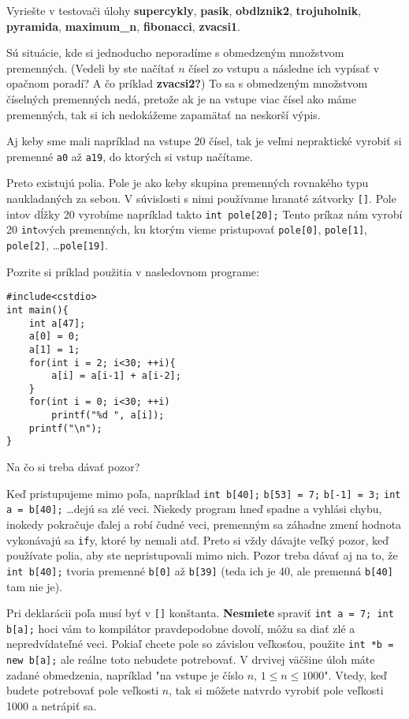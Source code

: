 Vyriešte v testovači úlohy \textbf{supercykly}, \textbf{pasik},
\textbf{obdlznik2}, \textbf{trojuholnik}, \textbf{pyramida}, 
\textbf{maximum\_n}, \textbf{fibonacci}, \textbf{zvacsi1}.


Sú situácie, kde si jednoducho neporadíme s obmedzeným množstvom premenných.
(Vedeli by ste načítať $n$ čísel zo vstupu a následne ich vypísať v opačnom
poradí? A čo príklad \textbf{zvacsi2?}) To sa s obmedzeným množstvom číselných
premenných nedá, pretože ak je na vstupe viac čísel ako máme premenných, tak si
ich nedokážeme zapamätať na neskorší výpis. 

Aj keby sme mali napríklad na vstupe 20 čísel, tak je veľmi nepraktické vyrobiť
si premenné \verb!a0! až \verb!a19!, do ktorých si vstup načítame.

Preto existujú polia. Pole je ako keby skupina premenných rovnakého typu
naukladaných za sebou. V súvislosti s nimi používame hranaté zátvorky
\verb![]!. Pole intov dĺžky 20 vyrobíme napríklad takto \verb!int pole[20];!
Tento príkaz nám vyrobí 20 \verb!int!ových premenných, ku ktorým vieme pristupovať
\verb!pole[0]!, \verb!pole[1]!, \verb!pole[2]!, \dots \verb!pole[19]!.

Pozrite si príklad použitia v nasledovnom programe:
\begin{lstlisting}
#include<cstdio>
int main(){
    int a[47];
    a[0] = 0;
    a[1] = 1;
    for(int i = 2; i<30; ++i){
        a[i] = a[i-1] + a[i-2];
    }
    for(int i = 0; i<30; ++i)
        printf("%d ", a[i]);
    printf("\n");
}
\end{lstlisting}

Na čo si treba dávať pozor?

Keď pristupujeme mimo poľa, napríklad \verb!int b[40];! \verb!b[53] = 7;!
\verb!b[-1] = 3;! \verb!int a = b[40];! \dots dejú sa zlé veci. Niekedy program
hneď spadne a vyhlási chybu, inokedy pokračuje ďalej a robí čudné veci,
premenným sa záhadne zmení hodnota vykonávajú sa \verb!if!y, ktoré by nemali
atď.  Preto si vždy dávajte veľký pozor, keď používate polia, aby ste
nepristupovali mimo nich.  Pozor treba dávať aj na to, že \verb!int b[40];!
tvoria premenné \verb!b[0]! až \verb!b[39]!  (teda ich je 40, ale premenná
\verb!b[40]! tam nie je).

Pri deklarácii poľa musí byť v \verb![]! konštanta.  \textbf{Nesmiete} spraviť
\verb!int a = 7; int b[a];! hoci vám to kompilátor pravdepodobne dovolí, môžu
sa diať zlé a nepredvídateľné veci.  Pokiaľ chcete pole so závislou veľkosťou,
použite \verb!int *b = new b[a];! ale reálne toto nebudete potrebovať. V
drvivej väčšine úloh máte zadané obmedzenia, napríklad "na vstupe je číslo $n$,
$1\leq n\leq 1000$". Vtedy, keď budete potrebovať pole veľkosti $n$, tak si
môžete natvrdo vyrobiť pole veľkosti 1000 a netrápiť sa.

